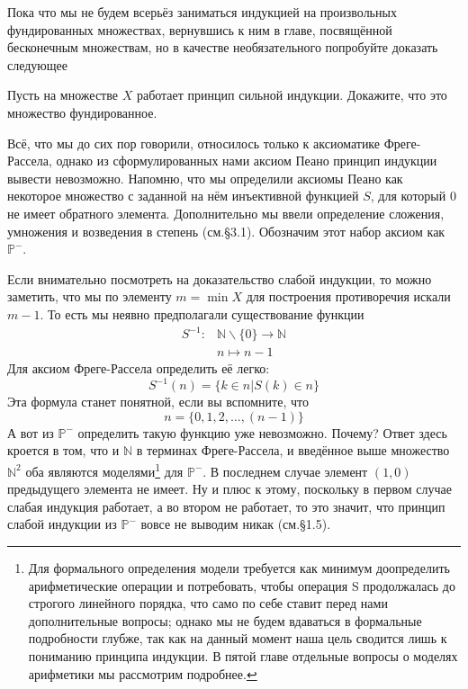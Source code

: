 Пока что мы не будем всерьёз заниматься индукцией на произвольных фундированных множествах, вернувшись к ним в главе, посвящённой бесконечным множествам, но в качестве необязательного попробуйте доказать следующее

\begin{exercise}
Пусть на множестве $X$ работает принцип сильной индукции. Докажите, что это множество фундированное.
\end{exercise}

Всё, что мы до сих пор говорили, относилось только к аксиоматике Фреге-Рассела, однако из сформулированных нами аксиом Пеано принцип индукции вывести невозможно. Напомню, что мы определили аксиомы Пеано как некоторое множество с заданной на нём инъективной функцией $S$, для который 0 не имеет обратного элемента. Дополнительно мы ввели определение сложения, умножения и возведения в степень (см.\S3.1). Обозначим этот набор аксиом как $\mathbb{P}^-$.

Если внимательно посмотреть на доказательство слабой индукции, то можно заметить, что мы по элементу $m=\min X$ для построения противоречия искали  $m-1$. То есть мы неявно предполагали существование функции
\begin{align*}
S^{-1}: & \mathbb{N}\backslash\{0\} \to \mathbb{N}\\
    & n \mapsto n-1
\end{align*}
Для аксиом Фреге-Рассела определить её легко:
$$S^{-1}(n) = \{k \in n | S(k) \in n\}$$
Эта формула станет понятной, если вы вспомните, что
$$n = \{0, 1, 2, \ldots, (n-1)\}$$
А вот из $\mathbb{P}^-$ определить такую функцию уже невозможно. Почему? Ответ здесь кроется в том, что и $\mathbb{N}$ в терминах Фреге-Рассела, и введённое выше множество $\mathbb{N}^2$ оба являются моделями\footnote{Для формального определения модели требуется как минимум доопределить арифметические операции и потребовать, чтобы операция S продолжалась до строгого линейного порядка, что само по себе ставит перед нами дополнительные вопросы; однако мы не будем вдаваться в формальные подробности глубже, так как на данный момент наша цель сводится лишь к пониманию принципа индукции. В пятой главе отдельные вопросы о моделях арифметики мы рассмотрим подробнее.} для $\mathbb{P}^-$. В последнем случае элемент $(1, 0)$ предыдущего элемента не имеет. Ну и плюс к этому, поскольку в первом случае слабая индукция работает, а во втором не работает, то это значит, что принцип слабой индукции из $\mathbb{P}^-$ вовсе не выводим никак (см.\S1.5).


